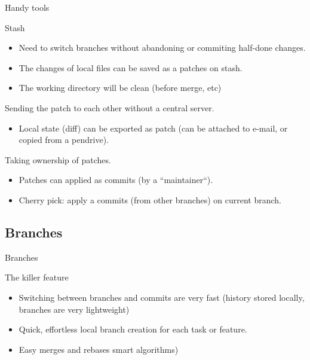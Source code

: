 \documentclass{beamer}
\begin{document}

\begin{frame}{Handy tools}

\begin{block}{Stash}
\begin{itemize}
 \item Need to switch branches without abandoning or commiting half-done changes.
 \item The changes of local files can be saved as a patches on stash.
 \item The working directory will be clean (before merge, etc)
\end{itemize}
\end{block}

\begin{block}{Sending the patch to each other without a central server.}
\begin{itemize}
 \item Local state (diff) can be exported as patch (can be attached to e-mail, or copied from a pendrive).
\end{itemize}
\end{block}

\begin{block}{Taking ownership of patches.}
\begin{itemize}
 \item Patches can applied as commits (by a ``maintainer``).
 \item Cherry pick: apply a commits (from other branches) on current branch.
\end{itemize}
\end{block}

\end{frame}


\subsection{Branches}

\begin{frame}{Branches}

\begin{block}{The killer feature}
\begin{itemize}
 \item Switching between branches and commits are very fast (history stored locally, branches are very lightweight)
 \item Quick, effortless local branch creation for each task or feature.
 \item Easy merges and rebases  smart algorithms)
\end{itemize}
\end{block}

\end{frame}
\end{document}

